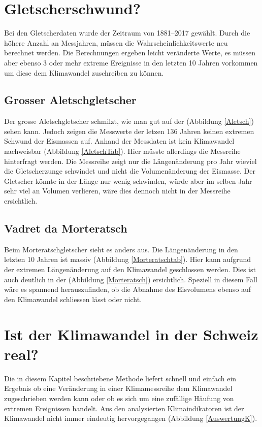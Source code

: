 \begin{refsection}
\section{Gletscherschwund?}
%
Bei den Gletscherdaten wurde der Zeitraum von 1881--2017 gewählt. Durch die höhere Anzahl an Messjahren, müssen die Wahrscheinlichkeitswerte neu berechnet werden. Die Berechnungen ergeben leicht veränderte Werte, es müssen aber ebenso 3 oder mehr extreme Ereignisse in den letzten 10 Jahren vorkommen um diese dem Klimawandel zuschreiben zu können.


\subsection{Grosser Aletschgletscher}
%
Der grosse Aletschgletscher schmilzt, wie man gut auf der (Abbildung \ref{Aletsch}) sehen kann. Jedoch zeigen die Messwerte der letzen 136 Jahren keinen extremen Schwund der Eismassen auf.
%
Anhand der Messdaten ist kein Klimawandel nachweisbar (Abbildung \ref{AletschTab}). Hier müsste allerdings die Messreihe hinterfragt werden. Die Messreihe zeigt nur die Längenänderung pro Jahr wieviel die Gletscherzunge schwindet und nicht die Volumenänderung der Eismasse. Der Gletscher könnte in der Länge nur wenig schwinden, würde aber im selben Jahr sehr viel an Volumen verlieren, wäre dies dennoch nicht in der Messreihe ersichtlich.


\subsection{Vadret da Morteratsch}
Beim Morteratschgletscher sieht es anders aus. Die Längenänderung in den letzten 10 Jahren ist massiv (Abbildung \ref{Morteratschtab}). Hier kann aufgrund der extremen Längenänderung auf den Klimawandel geschlossen werden. Dies ist auch deutlich in der (Abbildung \ref{Morteratsch}) ersichtlich. Speziell in diesem Fall wäre es spannend herauszufinden, ob die Abnahme des Eisvolumens ebenso auf den Klimawandel schliessen lässt oder nicht.


\section{Ist der Klimawandel in der Schweiz real?}
Die in diesem Kapitel beschriebene Methode liefert schnell und einfach ein Ergebnis ob eine Veränderung in einer Klimamessreihe dem Klimawandel zugeschrieben werden kann oder ob es sich um eine zufällige Häufung von extremen Ereignissen handelt. Aus den analysierten Klimaindikatoren ist der Klimawandel nicht immer eindeutig hervorgegangen (Abbildung \ref{AuswertungK}). 


\end{refsection}
